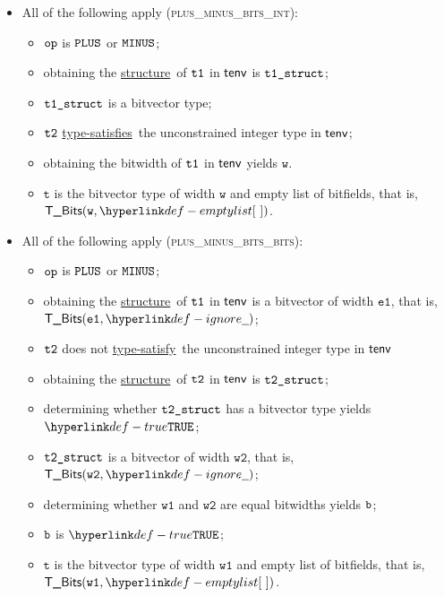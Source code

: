\documentclass{book}
\newcommand\ProseOrTypeError[0]{\ProseTerminateAs{\TypeErrorConfig}}
\newcommand\structure[0]{\hyperlink{def-structure}{structure}}
\newcommand\typesatisfies[0]{\hyperlink{def-typesatisfies}{type-satisfies}}
\newcommand\typesatisfy[0]{\hyperlink{def-typesatisfies}{type-satisfy}}
\newcommand\vt[0]{\texttt{t}}
\newcommand\veone[0]{\texttt{e1}}
\newcommand\vw[0]{\texttt{w}}
\newcommand\vwone[0]{\texttt{w1}}
\newcommand\vwtwo[0]{\texttt{w2}}
\begin{document}
\begin{itemize}
  \item All of the following apply (\textsc{plus\_minus\_bits\_int}):
  \begin{itemize}
    \item $\texttt{op}$ is $\texttt{PLUS}$ or $\texttt{MINUS}$;
    \item obtaining the \structure\ of $\texttt{t1}$ in $\textsf{tenv}$ is $\texttt{t1\_struct}$\ProseOrTypeError;
    \item $\texttt{t1\_struct}$ is a bitvector type;
    \item $\texttt{t2}$ \typesatisfies\ the unconstrained integer type in $\textsf{tenv}$;
    \item obtaining the bitwidth of $\texttt{t1}$ in $\textsf{tenv}$ yields $\vw$.
    \item $\vt$ is the bitvector type of width $\vw$ and empty list of bitfields, that is, \\ $\TBits(\vw, \emptylist)$.
  \end{itemize}

  \item All of the following apply (\textsc{plus\_minus\_bits\_bits}):
  \begin{itemize}
    \item $\texttt{op}$ is $\texttt{PLUS}$ or $\texttt{MINUS}$;
    \item obtaining the \structure\ of $\texttt{t1}$ in $\textsf{tenv}$ is a bitvector of width $\veone$, that is,\\ $\TBits(\veone, \Ignore)$;
    \item $\texttt{t2}$ does not \typesatisfy\ the unconstrained integer type in $\textsf{tenv}$
    \item obtaining the \structure\ of $\texttt{t2}$ in $\textsf{tenv}$ is $\texttt{t2\_struct}$\ProseOrTypeError;
    \item determining whether $\texttt{t2\_struct}$ has a bitvector type yields $\True$\ProseOrTypeError;
    \item $\texttt{t2\_struct}$ is a bitvector of width $\vwtwo$, that is, $\TBits(\vwtwo, \Ignore)$;
    \item determining whether $\vwone$ and $\vwtwo$ are equal bitwidths yields $\texttt{b}$;
    \item $\texttt{b}$ is $\True$\ProseOrTypeError;
    \item $\vt$ is the bitvector type of width $\vwone$ and empty list of bitfields, that is, \\ $\TBits(\vwone, \emptylist)$.
  \end{itemize}


\end{itemize}
\end{document}
